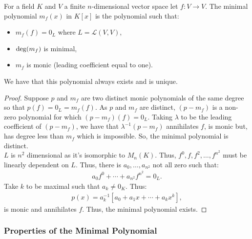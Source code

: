 For a field $K$ and $V$ a finite $n$-dimensional vector space let $f : V \to V$.
The minimal polynomial $m_f(x)$ in $K[x]$ is the polynomial such that: \begin{itemize}
  \item $m_f(f) = 0_L$ where $L = \mathcal{L}(V, V)$,
  \item $\operatorname{deg}(m_f)$ is minimal,
  \item $m_f$ is monic (leading coefficient equal to one).
\end{itemize} We have that this polynomial always exists and is unique.
\begin{proof}
    Suppose $p$ and $m_f$ are two distinct monic polynomials of the same
    degree so that $p(f) = 0_L = m_f(f)$. As $p$ and $m_f$ are distinct,
    $(p - m_f)$ is a non-zero polynomial for which $(p - m_f)(f) = 0_L$.
    Taking $\lambda$ to be the leading coefficient of $(p - m_f)$, we have
    that $\lambda^{-1}(p - m_f)$ annihilates $f$, is monic but, has degree
    less than $m_f$ which is impossible. So, the minimal polynomial is distinct.
    \\[\baselineskip]
    $L$ is $n^2$ dimensional as it's isomorphic to $M_n(K)$. Thus,
    $f^0, f, f^2, \ldots, f^{n^2}$ must be linearly dependent on $L$.
    Thus, there is $a_0, \ldots, a_{n^2}$ not all zero such that: \begin{gather*}
        a_0f^0 + \cdots + a_{n^2}f^{n^2} = 0_L.
    \end{gather*} Take $k$ to be maximal such that $a_k \neq 0_K$. Thus:
    \begin{gather*}
        p(x) = a_k^{-1}[a_0 + a_1x + \cdots + a_k x^k],
    \end{gather*} is monic and annihilates $f$. Thus, the minimal polynomial
    exists.
\end{proof}

\subsubsection{Properties of the Minimal Polynomial}

